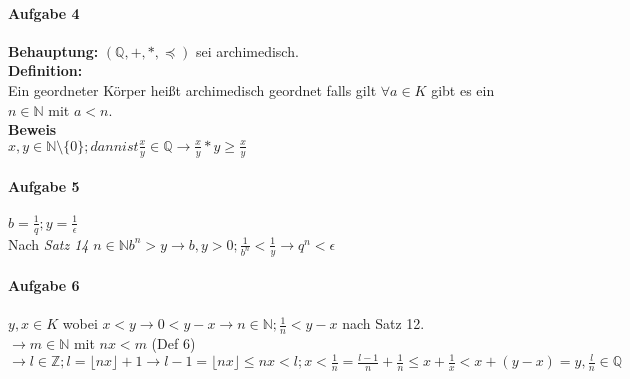 \documentclass[10pt,a4paper,draft]{scrartcl}
\begin{document}
\paragraph*{Aufgabe 4}
\begin{tabbing}
\textbf{Behauptung:} $(\mathbb{Q},+,*,\preceq)$ sei archimedisch.\\

\textbf{Definition:}\\
Ein geordneter Körper heißt archimedisch geordnet falls gilt $\forall a\in K$ gibt es ein $n\in \mathbb{N}$ mit $a<n$.\\

\textbf{Beweis}\\
$x,y\in \mathbb{N}\setminus \{0\}; dann ist \frac{x}{y}\in \mathbb{Q}\rightarrow \frac{x}{y}*y\geq \frac{x}{y}$
\end{tabbing}

\paragraph*{Aufgabe 5}
\begin{tabbing}
$b=\frac{1}{q}; y=\frac{1}{\epsilon}$\\
Nach \textit{Satz 14} $n\in \mathbb{N} b^{n}>y\rightarrow b,y>0; \frac{1}{b^{n}}<\frac{1}{y}\rightarrow q^{n}<\epsilon$\\ 
\end{tabbing}

\paragraph*{Aufgabe 6}
\begin{tabbing}
$y,x\in K$ wobei $x<y\rightarrow 0<y-x\rightarrow n\in\mathbb{N}; \frac{1}{n} <y-x$ nach Satz 12.\\
$\rightarrow m\in \mathbb{N}$ mit $nx<m$ (Def 6) $\rightarrow l\in \mathbb{Z}; l=\lfloor nx\rfloor +1\rightarrow l-1=\lfloor nx\rfloor\leq nx<l; x<\frac{1}{n} =\frac{l-1}{n} +\frac{1}{n}\leq x+\frac{1}{x} < x+(y-x)=y,\frac{l}{n}\in\mathbb{Q}$\\
\end{tabbing}
\end{document}
